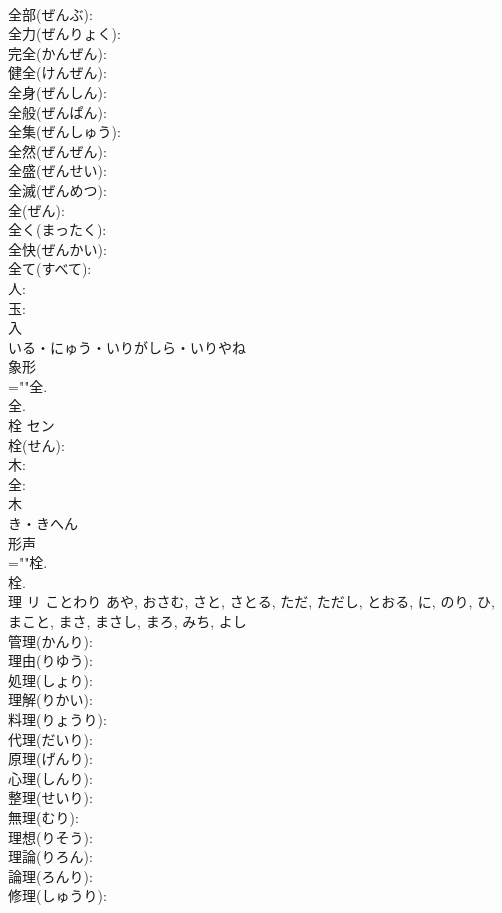 \documentclass[8pt]{extreport}
\begin{document}
\begin{CJK}{UTF8}{min}
\\	全部(ぜんぶ): 
\\	全力(ぜんりょく): 
\\	完全(かんぜん): 
\\	健全(けんぜん): 
\\	全身(ぜんしん): 
\\	全般(ぜんぱん): 
\\	全集(ぜんしゅう): 
\\	全然(ぜんぜん): 
\\	全盛(ぜんせい): 
\\	全滅(ぜんめつ): 
\\	全(ぜん): 
\\	全く(まったく): 
\\	全快(ぜんかい): 
\\	全て(すべて): 
\\	人: 
\\	玉: 
\\	入	
\\	いる・にゅう・いりがしら・いりやね	
\\	象形 
\\	=""全.
\\	全.
\\	栓	セン			
\\	栓(せん): 
\\	木: 
\\	全: 
\\	木	
\\	き・きへん	
\\	形声 
\\	=""栓.
\\	栓.
\\	理	リ	ことわり	あや, おさむ, さと, さとる, ただ, ただし, とおる, に, のり, ひ, まこと, まさ, まさし, まろ, みち, よし	
\\	管理(かんり): 
\\	理由(りゆう): 
\\	処理(しょり): 
\\	理解(りかい): 
\\	料理(りょうり): 
\\	代理(だいり): 
\\	原理(げんり): 
\\	心理(しんり): 
\\	整理(せいり): 
\\	無理(むり): 
\\	理想(りそう): 
\\	理論(りろん): 
\\	論理(ろんり): 
\\	修理(しゅうり): 

\end{CJK}
\end{document}

